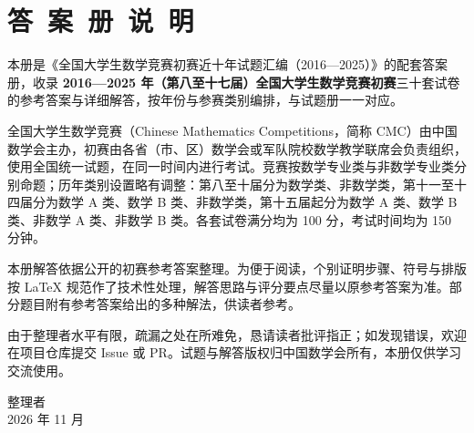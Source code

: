 \chapter*{答\ 案\ 册\ 说\ 明}

本册是《全国大学生数学竞赛初赛近十年试题汇编（2016—2025）》的配套答案册，收录 \textbf{2016—2025 年（第八至十七届）全国大学生数学竞赛初赛}三十套试卷的参考答案与详细解答，按年份与参赛类别编排，与试题册一一对应。

全国大学生数学竞赛（Chinese Mathematics Competitions，简称 CMC）由中国数学会主办，初赛由各省（市、区）数学会或军队院校数学教学联席会负责组织，使用全国统一试题，在同一时间内进行考试。竞赛按数学专业类与非数学专业类分别命题；历年类别设置略有调整：第八至十届分为数学类、非数学类，第十一至十四届分为数学 A 类、数学 B 类、非数学类，第十五届起分为数学 A 类、数学 B 类、非数学 A 类、非数学 B 类。各套试卷满分均为 100 分，考试时间均为 150 分钟。

本册解答依据公开的初赛参考答案整理。为便于阅读，个别证明步骤、符号与排版按 \LaTeX{} 规范作了技术性处理，解答思路与评分要点尽量以原参考答案为准。部分题目附有参考答案给出的多种解法，供读者参考。

由于整理者水平有限，疏漏之处在所难免，恳请读者批评指正；如发现错误，欢迎在项目仓库提交 Issue 或 PR。试题与解答版权归中国数学会所有，本册仅供学习交流使用。

\vspace{2em}
\begin{flushright}
  整理者\\
  2026 年 11 月
\end{flushright}
